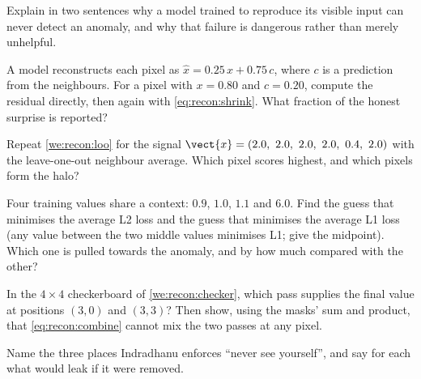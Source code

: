 \begin{checkyourself}
\item\label{ex:recon:1} Explain in two sentences why a model trained to reproduce its visible input can
never detect an anomaly, and why that failure is dangerous rather than merely unhelpful.
\item\label{ex:recon:2} A model reconstructs each pixel as $\hat{x} = 0.25\,x + 0.75\,c$, where $c$ is
a prediction from the neighbours. For a pixel with $x = 0.80$ and $c = 0.20$, compute the residual
directly, then again with \cref{eq:recon:shrink}. What fraction of the honest surprise is reported?
\item\label{ex:recon:3} Repeat \cref{we:recon:loo} for the signal $\vect{x} = (2.0,\ 2.0,\ 2.0,\ 2.0,\
0.4,\ 2.0)$ with the leave-one-out neighbour average. Which pixel scores highest, and which pixels form
the halo?
\item\label{ex:recon:4} Four training values share a context: $0.9$, $1.0$, $1.1$ and $6.0$. Find the
guess that minimises the average L2 loss and the guess that minimises the average L1 loss (any value
between the two middle values minimises L1; give the midpoint). Which one is pulled towards the
anomaly, and by how much compared with the other?
\item\label{ex:recon:5} In the $4\times4$ checkerboard of \cref{we:recon:checker}, which pass supplies
the final value at positions $(3,0)$ and $(3,3)$? Then show, using the masks' sum and product, that
\cref{eq:recon:combine} cannot mix the two passes at any pixel.
\item\label{ex:recon:6} Name the three places Indradhanu enforces ``never see yourself'', and say for
each what would leak if it were removed.
\end{checkyourself}

